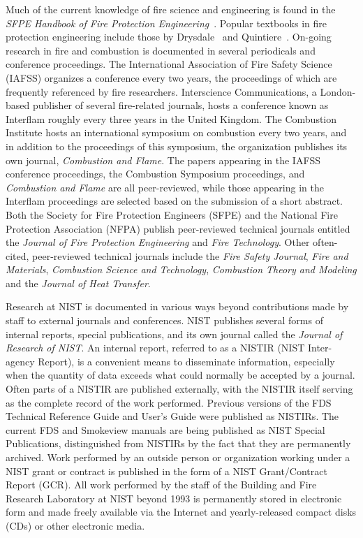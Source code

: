 \documentclass[11pt]{book}
\begin{document}
Much of the current knowledge of fire science and engineering is found in the {\em SFPE Handbook of Fire Protection Engineering}~\cite{SFPE}. Popular
textbooks in fire protection engineering include those by Drysdale~\cite{Drysdale:1} and Quintiere~\cite{Quintiere:2}. On-going research in fire and
combustion is documented in several periodicals and conference proceedings. The International Association of Fire Safety Science (IAFSS) organizes a
conference every two years, the proceedings of which are frequently referenced by fire researchers. Interscience Communications, a London-based
publisher of several fire-related journals, hosts a conference known as Interflam roughly every three years in the United Kingdom. The Combustion
Institute hosts an international symposium on combustion every two years, and in addition to the proceedings of this symposium, the organization
publishes its own journal, {\em Combustion and Flame}. The papers appearing in the IAFSS conference proceedings, the Combustion Symposium
proceedings, and {\em Combustion and Flame} are all peer-reviewed, while those appearing in the Interflam proceedings are selected based on the
submission of a short abstract. Both the Society for Fire Protection Engineers (SFPE) and the National Fire Protection Association (NFPA) publish
peer-reviewed technical journals entitled the {\em Journal of Fire Protection Engineering} and {\em Fire Technology}. Other often-cited,
peer-reviewed technical journals include the {\em Fire Safety Journal}, {\em Fire and Materials}, {\em Combustion Science and Technology}, {\em
Combustion Theory and Modeling} and the {\em Journal of Heat Transfer}.

Research at NIST is documented in various ways beyond contributions made by staff to external journals and conferences. NIST publishes several forms
of internal reports, special publications, and its own journal called the {\em Journal of Research of NIST}. An internal report, referred to as a
NISTIR (NIST Inter-agency Report), is a convenient means to disseminate information, especially when the quantity of data exceeds what could normally
be accepted by a journal. Often parts of a NISTIR are published externally, with the NISTIR itself serving as the complete record of the work
performed. Previous versions of the FDS Technical Reference Guide and User's Guide were published as NISTIRs. The current FDS and Smokeview manuals
are being published as NIST Special Publications, distinguished from NISTIRs by the fact that they are permanently archived. Work performed by an
outside person or organization working under a NIST grant or contract is published in the form of a NIST Grant/Contract Report (GCR). All work
performed by the staff of the Building and Fire Research Laboratory at NIST beyond 1993 is permanently stored in electronic form and made freely
available via the Internet and yearly-released compact disks (CDs) or other electronic media.
\end{document}
